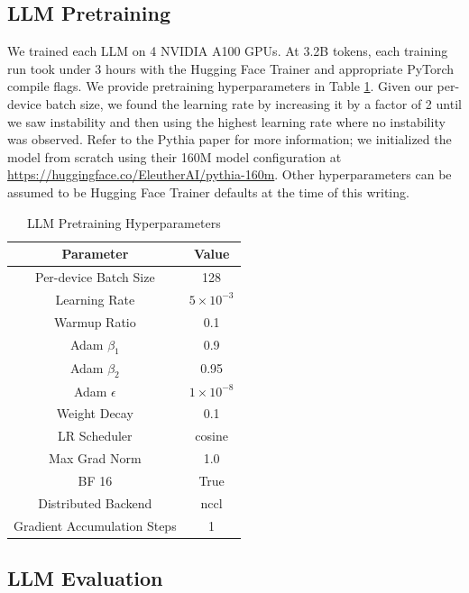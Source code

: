 \documentclass{article} %
\begin{document}
\subsection{LLM Pretraining}

We trained each LLM on 4 NVIDIA A100 GPUs. At 3.2B tokens, each training run took under 3 hours with the Hugging Face Trainer \citep{transformers} and appropriate PyTorch \citep{pytorch} compile flags. We provide pretraining hyperparameters in Table \ref{pretraining_hyperparameters}. Given our per-device batch size, we found the learning rate by increasing it by a factor of 2 until we saw instability and then using the highest learning rate where no instability was observed. Refer to the Pythia paper \citep{pythia} for more information; we initialized the model from scratch using their 160M model configuration at \url{https://huggingface.co/EleutherAI/pythia-160m}. Other hyperparameters can be assumed to be Hugging Face Trainer defaults at the time of this writing.

\begin{table}[t]
\centering
\caption{LLM Pretraining Hyperparameters}
\begin{tabular}{|c|c|}
\hline
\textbf{Parameter} & \textbf{Value} \\
\hline
Per-device Batch Size & 128 \\
\hline
Learning Rate & $5 \times 10^{-3}$ \\
\hline
Warmup Ratio & 0.1 \\
\hline
Adam $\beta_1$ & 0.9 \\
\hline
Adam $\beta_2$ & 0.95 \\
\hline
Adam $\epsilon$ & $1 \times 10^{-8}$ \\
\hline
Weight Decay & 0.1 \\
\hline
LR Scheduler & cosine \\
\hline
Max Grad Norm & 1.0 \\
\hline
BF 16 & True \\
\hline
Distributed Backend & nccl \\
\hline
Gradient Accumulation Steps & 1 \\
\hline
\end{tabular}
\label{pretraining_hyperparameters}
\end{table}

\subsection{LLM Evaluation}
\end{document}
